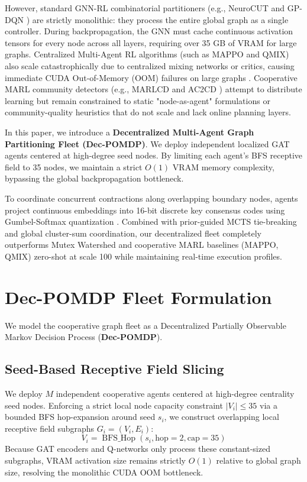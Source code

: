 \documentclass[10pt]{article}
\begin{document}
However, standard GNN-RL combinatorial partitioners (e.g., NeuroCUT \citep{neurocut} and GP-DQN \citep{cao2025gpdqn}) are strictly monolithic: they process the entire global graph as a single controller. During backpropagation, the GNN must cache continuous activation tensors for every node across all layers, requiring over 35 GB of VRAM for large graphs. Centralized Multi-Agent RL algorithms (such as MAPPO and QMIX) also scale catastrophically due to centralized mixing networks or critics, causing immediate CUDA Out-of-Memory (OOM) failures on large graphs \citep{yu2022mappo, rashid2018qmix}. Cooperative MARL community detectors (e.g., MARLCD \citep{alipour2022marlcd} and AC2CD \citep{ac2cd2023}) attempt to distribute learning but remain constrained to static "node-as-agent" formulations or community-quality heuristics that do not scale and lack online planning layers.

In this paper, we introduce a \textbf{Decentralized Multi-Agent Graph Partitioning Fleet (Dec-POMDP)}. We deploy independent localized GAT agents \citep{velickovic2018gat} centered at high-degree seed nodes. By limiting each agent's BFS receptive field to 35 nodes, we maintain a strict \(O(1)\) VRAM memory complexity, bypassing the global backpropagation bottleneck. 

To coordinate concurrent contractions along overlapping boundary nodes, agents project continuous embeddings into 16-bit discrete key consensus codes using Gumbel-Softmax quantization \citep{jang2016gumbel}. Combined with prior-guided MCTS tie-breaking and global cluster-sum coordination, our decentralized fleet completely outperforms Mutex Watershed and cooperative MARL baselines (MAPPO, QMIX) zero-shot at scale 100 while maintaining real-time execution profiles.

\section{Dec-POMDP Fleet Formulation}
We model the cooperative graph fleet as a Decentralized Partially Observable Markov Decision Process (\textbf{Dec-POMDP}). 

\subsection{Seed-Based Receptive Field Slicing}
We deploy $M$ independent cooperative agents centered at high-degree centrality seed nodes. Enforcing a strict local node capacity constraint $|V_i| \le 35$ via a bounded BFS hop-expansion around seed $s_i$, we construct overlapping local receptive field subgraphs $G_i = (V_i, E_i)$:
\begin{equation}
V_i = \operatorname{BFS\_Hop}(s_i, \text{hop}=2, \text{cap}=35)
\end{equation}
Because GAT encoders and Q-networks only process these constant-sized subgraphs, VRAM activation size remains strictly $O(1)$ relative to global graph size, resolving the monolithic CUDA OOM bottleneck. 
\end{document}
